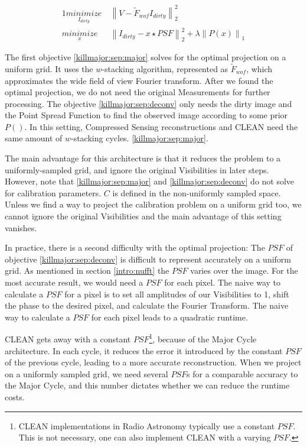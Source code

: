 \begin{alignat}{1}
\underset{I_{dirty}}{minimize} \:& \left \|  V - \tilde{F}_{wof}I_{dirty} \right \|_2^2\label{killmajor:sep:major}\\
\underset{x}{minimize} \:& \left \| I_{dirty} - x \star PSF \right \|_2^2 + \lambda \left \| P(x) \right \|_1 \label{killmajor:sep:deconv}
\end{alignat}

The first objective \eqref{killmajor:sep:major} solves for the optimal projection on a uniform grid. It uses the $w$-stacking algorithm, represented as $\tilde{F}_{wof}$, which approximates the wide field of view Fourier transform. After we found the optimal projection, we do not need the original Measurements for further processing. The objective \eqref{killmajor:sep:deconv} only needs the dirty image and the Point Spread Function to find the observed image according to some prior $P()$. In this setting, Compressed Sensing reconstructions and CLEAN need the same amount of $w$-stacking cycles.  \eqref{killmajor:sep:major}. 

The main advantage for this architecture is that it reduces the problem to a uniformly-sampled grid, and ignore the original Visibilities in later steps. However, note that \eqref{killmajor:sep:major} and \eqref{killmajor:sep:deconv} do not solve for calibration parameters. $C$ is defined in the non-uniformly sampled space. Unless we find a way to project the calibration problem on a uniform grid too, we cannot ignore the original Visibilities and the main advantage of this setting vanishes. 

In practice, there is a second difficulty with the optimal projection: The $PSF$ of objective \eqref{killmajor:sep:deconv} is difficult to represent accurately on a uniform grid. As mentioned in section \ref{intro:nufft} the $PSF$ varies over the image. For the most accurate result, we would need a $PSF$ for each pixel. The naive way to calculate a $PSF$ for a pixel is to set all amplitudes of our Visibilities to 1, shift the phase to the desired pixel, and calculate the Fourier Transform. The naive way to calculate a $PSF$ for each pixel leads to a quadratic runtime.

CLEAN gets away with a constant $PSF$\footnote{CLEAN implementations in Radio Astronomy typically use a constant $PSF$. This is not necessary, one can also implement CLEAN with a varying $PSF$.}, because of the Major Cycle architecture. In each cycle, it reduces the error it introduced by the constant $PSF$ of the previous cycle, leading to a more accurate reconstruction. When we project on a uniformly sampled grid, we need several $PSF$s for a comparable accuracy to the Major Cycle, and this number dictates whether we can reduce the runtime costs. 

